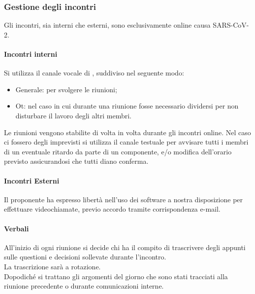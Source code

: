 		 \subsubsection{Gestione degli incontri}
		 Gli incontri, sia interni che esterni, sono esclusivamente online causa SARS-CoV-2.
		 \paragraph{Incontri interni}
		 Si utilizza il canale vocale di , suddiviso nel seguente modo:
		 
		 \begin{itemize}
		 	\item {\sffamily Generale}: per svolgere le riunioni;
		 	\item {\sffamily Ot}: nel caso in cui durante una riunione fosse necessario dividersi per non disturbare il lavoro degli altri membri.
	 	\end{itemize}
 		Le riunioni vengono stabilite di volta in volta durante gli incontri online. 
 		Nel caso ci fossero degli imprevisti si utilizza il canale testuale per avvisare tutti i membri di un eventuale ritardo da parte di un componente, e/o modifica dell'orario previsto assicurandosi che tutti diano conferma.
		 \paragraph{Incontri Esterni}
		 Il proponente ha espresso libertà nell'uso dei software a nostra disposizione per effettuare videochiamate, previo accordo tramite corrispondenza e-mail.
		 
		 \paragraph{Verbali}
		 All'inizio di ogni riunione si decide chi ha il compito di trascrivere degli appunti sulle questioni e decisioni sollevate durante l'incontro. \\
		 La trascrizione sarà a rotazione. \\
     
		 Dopodiché si trattano gli argomenti del giorno che sono stati tracciati alla riunione precedente o durante comunicazioni interne. 
		 
